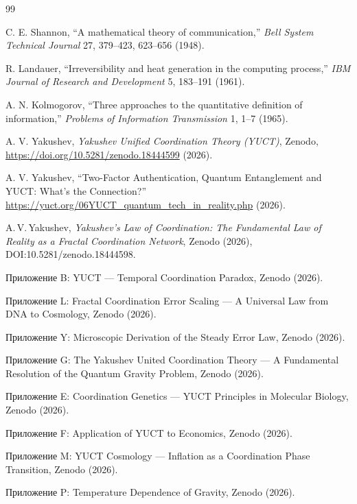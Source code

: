 \documentclass[12pt,a4paper]{article}
\theoremstyle{remark}
\begin{document}
	\begin{thebibliography}{99}
		
		C. E. Shannon, ``A mathematical theory of communication,'' \emph{Bell System Technical Journal} 27, 379–423, 623–656 (1948).
		
		R. Landauer, ``Irreversibility and heat generation in the computing process,'' \emph{IBM Journal of Research and Development} 5, 183–191 (1961).
		
		A. N. Kolmogorov, ``Three approaches to the quantitative definition of information,'' \emph{Problems of Information Transmission} 1, 1–7 (1965).
		
		A. V. Yakushev, \emph{Yakushev Unified Coordination Theory (YUCT)}, Zenodo, \url{https://doi.org/10.5281/zenodo.18444599} (2026).
		
		A. V. Yakushev, ``Two-Factor Authentication, Quantum Entanglement and YUCT: What's the Connection?'' \url{https://yuct.org/06YUCT_quantum_tech_in_reality.php} (2026).
		
		A.\,V.\,Yakushev, \emph{Yakushev's Law of Coordination: The Fundamental Law
			of Reality as a Fractal Coordination Network}, Zenodo (2026),		DOI:10.5281/zenodo.18444598.
		
		Приложение B: YUCT — Temporal Coordination Paradox, Zenodo (2026).
		
		Приложение L: Fractal Coordination Error Scaling — A Universal Law from DNA to Cosmology, Zenodo (2026).
		
		Приложение Y: Microscopic Derivation of the Steady Error Law, Zenodo (2026).
		
		Приложение G: The Yakushev United Coordination Theory — A Fundamental Resolution of the Quantum Gravity Problem, Zenodo (2026).
		
		Приложение E: Coordination Genetics — YUCT Principles in Molecular Biology, Zenodo (2026).
		
		Приложение F: Application of YUCT to Economics, Zenodo (2026).
		
		Приложение M: YUCT Cosmology — Inflation as a Coordination Phase Transition, Zenodo (2026).
		
		Приложение P: Temperature Dependence of Gravity, Zenodo (2026).
		

\end{thebibliography}
\end{document}

